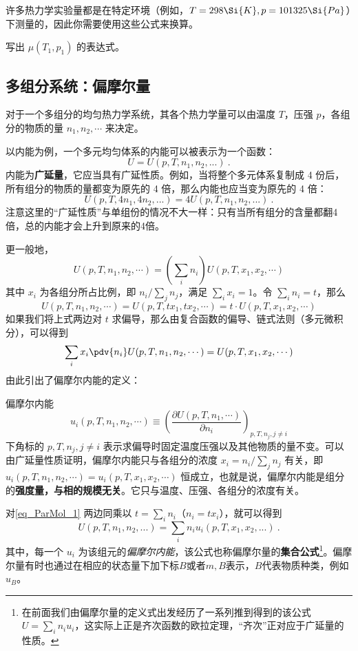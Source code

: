 许多热力学实验量都是在特定环境（例如，$T = 298 \Si{K}, p = 101325\Si{Pa}$）下测量的，因此你需要使用这些公式来换算。

\begin{exercise}{}
写出 $\mu(T_1,p_1)$ 的表达式。
\end{exercise}

\subsection{多组分系统：偏摩尔量}
对于一个多组分的均匀热力学系统，其各个热力学量可以由温度 $T$，压强 $p$，各组分的物质的量 $n_1,n_2,\cdots $ 来决定。

以内能为例，一个多元均匀体系的内能可以被表示为一个函数：
\begin{equation}
U = U (p, T, n_1, n_2, ...)~.
\end{equation}
内能为\textbf{广延量}，它应当具有广延性质。例如，当将整个多元体系复制成 4 份后，所有组分的物质的量都变为原先的 4 倍，那么内能也应当变为原先的 4 倍：
$$ U (p, T, 4n_1, 4n_2, ...) = 4U (p, T, n_1, n_2, ...)~.$$
注意这里的“广延性质”与单组份的情况不大一样：只有当所有组分的含量都翻4倍，总的内能才会上升到原来的4倍。

更一般地，
\begin{equation}
U(p,T,n_1,n_2,\cdots )=\left(\sum_i n_i\right) U(p,T,x_1,x_2,\cdots)
\end{equation}
其中 $x_i$ 为各组分所占比例，即 $n_i/\sum_j n_j$，满足 $\sum_i x_i=1$。令 $\sum_i n_i=t$，那么
\begin{equation}
U(p,T,n_1,n_2,\cdots)=U(p,T,tx_1,tx_2,\cdots)=t\cdot U(p,T,x_1,x_2,\cdots)
\end{equation}
如果我们将上式两边对 $t$ 求偏导，那么由复合函数的偏导、链式法则（多元微积分），可以得到
\begin{equation}\label{eq_ParMol_1}
\sum_i x_i \pdv{n_i} U(p,T,n_1,n_2,\cdots )=U(p,T,x_1,x_2,\cdots)
\end{equation}
由此引出了偏摩尔内能的定义：
\begin{definition}{偏摩尔内能}
\begin{equation}
u_i(p,T,n_1,n_2,\cdots )\equiv \left(\frac{\partial U(p,T,n_1,\cdots)}{\partial n_i}\right)_{p,T,n_j,j\neq i}
\end{equation}
下角标的 $p,T,n_j,j\neq i$ 表示求偏导时固定温度压强以及其他物质的量不变。可以由广延量性质证明，偏摩尔内能只与各组分的浓度 $x_i=n_i/\sum_j n_j$ 有关，即 $u_i(p,T,n_1,n_2,\cdots)=u_i(p,T,x_1,x_2,\cdots)$ 恒成立，也就是说，偏摩尔内能是组分的\textbf{强度量，与相的规模无关}。它只与温度、压强、各组分的浓度有关。
\end{definition}
对\autoref{eq_ParMol_1} 两边同乘以 $t=\sum_i n_i$（$n_i=tx_i$），就可以得到
\begin{equation}\label{eq_ParMol_2}
U (p, T, n_1, n_2, ...) = \sum_i n_i u_i(p, T, x_1, x_2, ...)~. 
\end{equation}
其中，每一个 $u_i$ 为该组元的\textsl{偏摩尔内能}，该公式也称偏摩尔量的\textbf{集合公式}\footnote{在前面我们由偏摩尔量的定义式出发经历了一系列推到得到的该公式 $U=\sum_i n_i u_i$，这实际上正是齐次函数的欧拉定理，“齐次”正对应于广延量的性质。}。偏摩尔量有时也通过在相应的状态量下加下标$B$或者$m,B$表示，$B$代表物质种类，例如$u_B$。


